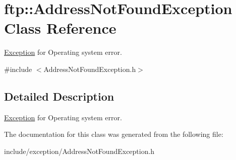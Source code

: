 \hypertarget{classftp_1_1_address_not_found_exception}{\section{ftp\-:\-:Address\-Not\-Found\-Exception Class Reference}
\label{classftp_1_1_address_not_found_exception}
}


\hyperlink{classftp_1_1_exception}{Exception} for Operating system error.  




{\ttfamily \#include $<$Address\-Not\-Found\-Exception.\-h$>$}



\subsection{Detailed Description}
\hyperlink{classftp_1_1_exception}{Exception} for Operating system error. 

The documentation for this class was generated from the following file\-:\begin{DoxyCompactItemize}
\item 
include/exception/Address\-Not\-Found\-Exception.\-h\end{DoxyCompactItemize}
